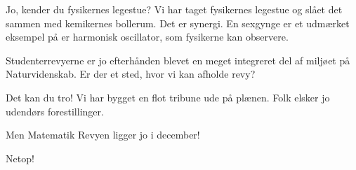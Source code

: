 \documentclass[a4paper,11pt]{article}
\begin{document}
\begin{sketch}
 Jo, kender du fysikernes legestue? Vi har taget fysikernes legestue og slået det sammen med kemikernes bollerum. Det er synergi. En sexgynge er et udmærket eksempel på er harmonisk oscillator, som fysikerne kan observere.

 Studenterrevyerne er jo efterhånden blevet en meget integreret del af miljøet på Naturvidenskab. Er der et sted, hvor vi kan afholde revy?

 Det kan du tro! Vi har bygget en flot tribune ude på plænen. Folk elsker jo udendørs forestillinger.

 Men Matematik Revyen ligger jo i december!

 Netop!

\end{sketch}
\end{document}
